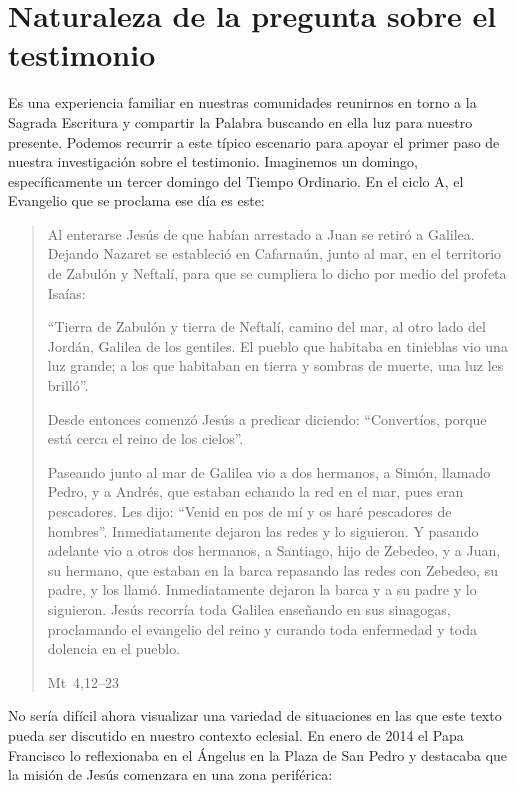 \section{Naturaleza de la pregunta sobre el testimonio}
Es una experiencia familiar en nuestras comunidades reunirnos en torno a la
Sagrada Escritura y compartir la Palabra buscando en ella luz para nuestro
presente. Podemos recurrir a este típico escenario para apoyar el primer paso de
nuestra investigación sobre el testimonio. Imaginemos un domingo,
específicamente un tercer domingo del Tiempo Ordinario. En el ciclo A, el
Evangelio que se proclama ese día es este:

\blockquote[Mt~4,12--23]{Al enterarse Jesús de que habían arrestado a Juan se
  retiró a Galilea. Dejando Nazaret se estableció en Cafarnaún, junto al mar, en
  el territorio de Zabulón y Neftalí, para que se cumpliera lo dicho por medio
  del profeta Isaías:

  \enquote{Tierra de Zabulón y tierra de Neftalí, camino del mar, al otro lado
    del Jordán, Galilea de los gentiles. El pueblo que habitaba en tinieblas vio
    una luz grande; a los que habitaban en tierra y sombras de muerte, una luz
    les brilló}.

  Desde entonces comenzó Jesús a predicar diciendo: \enquote{Convertíos, porque
    está cerca el reino de los cielos}.

  Paseando junto al mar de Galilea vio a dos hermanos, a Simón, llamado Pedro, y
  a Andrés, que estaban echando la red en el mar, pues eran pescadores. Les
  dijo: \enquote{Venid en pos de mí y os haré pescadores de hombres}.
  Inmediatamente dejaron las redes y lo siguieron. Y pasando adelante vio a
  otros dos hermanos, a Santiago, hijo de Zebedeo, y a Juan, su hermano, que
  estaban en la barca repasando las redes con Zebedeo, su padre, y los llamó.
  Inmediatamente dejaron la barca y a su padre y lo siguieron. Jesús recorría
  toda Galilea enseñando en sus sinagogas, proclamando el evangelio del reino y
  curando toda enfermedad y toda dolencia en el pueblo.}

No sería difícil ahora visualizar una variedad de situaciones en las que este
texto pueda ser discutido en nuestro contexto eclesial. En enero de 2014 el Papa
Francisco lo reflexionaba en el Ángelus en la Plaza de San Pedro y destacaba que
la misión de Jesús comenzara en una zona periférica:


